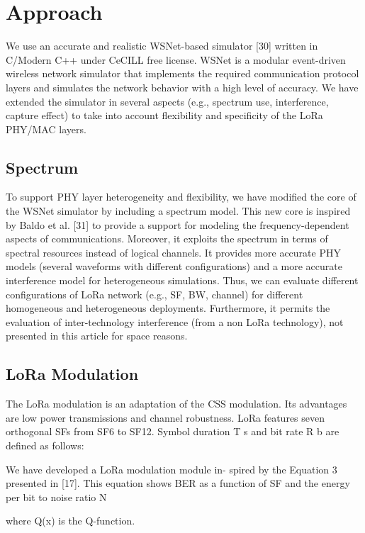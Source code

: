 \section{Approach} \label{sec:Approach}

We use an accurate and realistic WSNet-based simulator [30] written in C/Modern C++ under CeCILL free license.
WSNet is a modular event-driven wireless network simulator that implements the required communication protocol layers and simulates the network behavior with a high level of accuracy.
We have extended the simulator in several aspects (e.g.,
	spectrum use,
	interference,
	capture effect) to take into account flexibility and specificity of the LoRa PHY/MAC layers.

\subsection{Spectrum}

To support PHY layer heterogeneity and flexibility,
	we have modified the core of the WSNet simulator by including a spectrum model.
This new core is inspired by Baldo et al.
[31] to provide a support for modeling the frequency-dependent aspects of communications.
Moreover,
	it exploits the spectrum in terms of spectral resources instead of logical channels.
It provides more accurate PHY models (several waveforms with different configurations) and a more accurate interference model for heterogeneous simulations.
Thus,
	we can evaluate different configurations of LoRa network (e.g.,
	SF,
	BW,
	channel) for different homogeneous and heterogeneous deployments.
Furthermore,
	it permits the evaluation of inter-technology interference (from a non LoRa technology),
	not presented in this article for space reasons.


\subsection{LoRa Modulation}

The LoRa modulation is an adaptation of the CSS modulation.
Its advantages are low power transmissions and channel robustness.
LoRa features seven orthogonal SFs from SF6 to SF12.
Symbol duration T s and bit rate R b are defined as follows:


We have developed a LoRa modulation module in-
spired by the Equation 3 presented in [17]. This equation
shows BER as a function of SF and the energy per bit to noise ratio N

where Q(x) is the Q-function.




